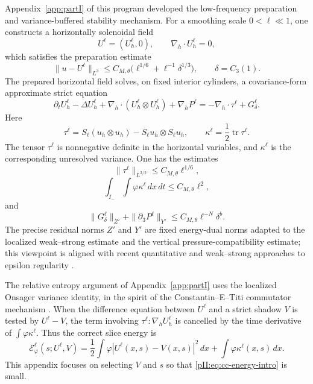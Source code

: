 \documentclass[11pt]{article}
\numberwithin{equation}{section}
\theoremstyle{plain}
\theoremstyle{definition}
\theoremstyle{remark}
\newcommand{\dx}{\,dx}
\newcommand{\dxdt}{\,dx\,dt}
\begin{document}
Appendix~\ref{app:partI} of this program developed the low-frequency preparation and variance-buffered stability mechanism.  For a smoothing scale $0<\ell\ll1$, one constructs a horizontally solenoidal field
\[
        U^\ell=(U_h^\ell,0),
        \qquad \nabla_h\cdot U_h^\ell=0,
\]
which satisfies the preparation estimate
\begin{equation}\label{pII:eq:prep-tail}
        \|u-U^\ell\|_{L^3}\le C_{M,\theta}
        \bigl(\ell^{1/6}+\ell^{-1}\delta^{1/3}\bigr),
        \qquad \delta=C_3(1).
\end{equation}
The prepared horizontal field solves, on fixed interior cylinders, a covariance-form approximate strict equation
\begin{equation}\label{pII:eq:prepared-covariance-equation-intro}
        \partial_tU_h^\ell-\Delta U_h^\ell
        +\nabla_h\cdot(U_h^\ell\otimes U_h^\ell)+\nabla_hP^\ell
        =-\nabla_h\cdot\tau^\ell+G_\delta^\ell.
\end{equation}
Here
\begin{equation}\label{pII:eq:tau-kappa}
        \tau^\ell=S_\ell(u_h\otimes u_h)-S_\ell u_h\otimes S_\ell u_h,
        \qquad
        \kappa^\ell=\frac12\operatorname{tr}\tau^\ell.
\end{equation}
The tensor $\tau^\ell$ is nonnegative definite in the horizontal variables, and $\kappa^\ell$ is the corresponding unresolved variance.  One has the estimates
\begin{equation}\label{pII:eq:tau-est-intro}
        \|\tau^\ell\|_{L^{3/2}}\le C_{M,\theta}\ell^{1/6},
\end{equation}
\begin{equation}\label{pII:eq:kappa-average-intro}
        \int_{I_-}\int \varphi\kappa^\ell\dxdt\le C_{M,\theta}\ell^2,
\end{equation}
and
\begin{equation}\label{pII:eq:G-est-intro}
        \|G_\delta^\ell\|_{Z'}+
        \|\partial_3P^\ell\|_{Y'}
        \le C_{M,\theta}\ell^{-N}\delta^b.
\end{equation}
The precise residual norms $Z'$ and $Y'$ are fixed energy-dual norms adapted to the localized weak--strong estimate and the vertical pressure-compatibility estimate; this viewpoint is aligned with recent quantitative and weak--strong approaches to epsilon regularity \cite{BarkerPrange2021,AlbrittonBarkerPrange2023}.

The relative entropy argument of Appendix~\ref{app:partI} uses the localized Onsager variance identity, in the spirit of the Constantin--E--Titi commutator mechanism \cite{ConstantinETiti1994}.  When the difference equation between $U^\ell$ and a strict shadow $V$ is tested by $U^\ell-V$, the term involving $\tau^\ell:\nabla_hU_h^\ell$ is cancelled by the time derivative of $\int\varphi\kappa^\ell$.  Thus the correct slice energy is
\begin{equation}\label{pII:eq:cc-energy-intro}
        \mathcal E_\varphi^\ell(s;U^\ell,V)
        =\frac12\int \varphi |U^\ell(x,s)-V(x,s)|^2\dx
        +\int \varphi\kappa^\ell(x,s)\dx.
\end{equation}
This appendix focuses on selecting $V$ and $s$ so that \eqref{pII:eq:cc-energy-intro} is small.
\end{document}
